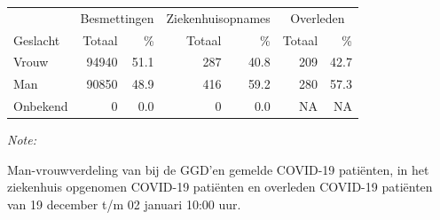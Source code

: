 \documentclass[
  english,
  man,floatsintext]{apa6}
\begin{document}
\begin{table}
\centering\begingroup\fontsize{11}{13}\selectfont

\begin{threeparttable}
\begin{tabular}{lrrrrrr}
\toprule
\multicolumn{1}{c}{ } & \multicolumn{2}{c}{Besmettingen} & \multicolumn{2}{c}{Ziekenhuisopnames} & \multicolumn{2}{c}{Overleden} \\
\cmidrule(l{3pt}r{3pt}){2-3} \cmidrule(l{3pt}r{3pt}){4-5} \cmidrule(l{3pt}r{3pt}){6-7}
Geslacht & Totaal & \% & Totaal & \% & Totaal & \%\\
\midrule
Vrouw & 94940 & 51.1 & 287 & 40.8 & 209 & 42.7\\
Man & 90850 & 48.9 & 416 & 59.2 & 280 & 57.3\\
Onbekend & 0 & 0.0 & 0 & 0.0 & NA & NA\\
\bottomrule
\end{tabular}
\begin{tablenotes}
\item \textit{Note: } 
\item Man-vrouwverdeling van bij de GGD’en gemelde COVID-19 patiënten, in het ziekenhuis opgenomen COVID-19 patiënten en overleden COVID-19 patiënten van 19 december t/m 02 januari 10:00 uur.
\end{tablenotes}
\end{threeparttable}
\endgroup{}
\end{table}
\newpage
\end{document}
